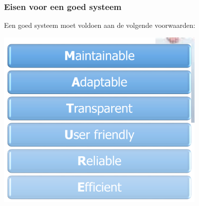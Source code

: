 \newpage
\subsubsection{Eisen voor een goed systeem}

Een goed systeem moet voldoen aan de volgende voorwaarden:

\begin{center}
\includegraphics[width=4in]{img/requirementsforgoodsystem}%
\end{center}

